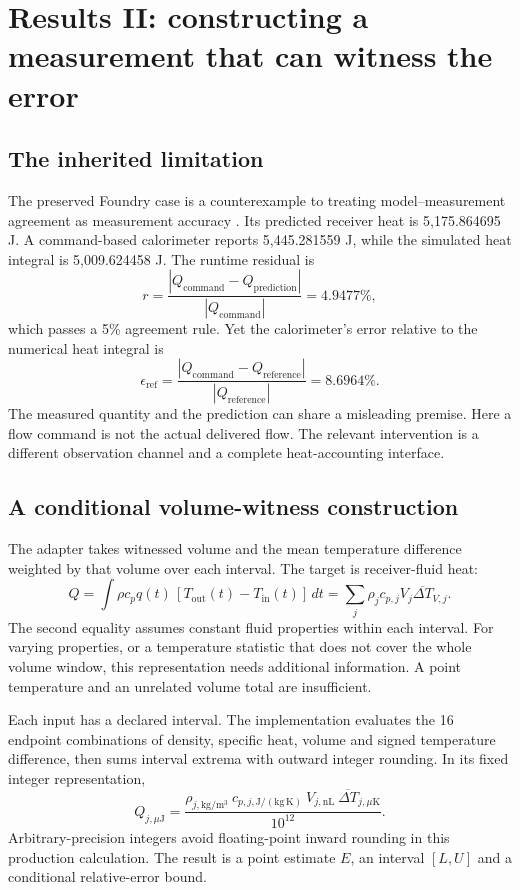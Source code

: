 \documentclass[11pt,a4paper]{article}
\begin{document}
\section{Results II: constructing a measurement that can witness the error}\label{sec:thermal}
\subsection{The inherited limitation}
The preserved Foundry case is a counterexample to treating model--measurement agreement as measurement accuracy \cite{boucher2026foundry}. Its predicted receiver heat is 5,175.864695 J. A command-based calorimeter reports 5,445.281559 J, while the simulated heat integral is 5,009.624458 J. The runtime residual is
\begin{equation}
r=\frac{|Q_{\mathrm{command}}-Q_{\mathrm{prediction}}|}
{|Q_{\mathrm{command}}|}=4.9477\%,
\end{equation}
which passes a 5\% agreement rule. Yet the calorimeter's error relative to the numerical heat integral is
\begin{equation}
\epsilon_{\mathrm{ref}}=
\frac{|Q_{\mathrm{command}}-Q_{\mathrm{reference}}|}
{|Q_{\mathrm{reference}}|}=8.6964\%.
\end{equation}
The measured quantity and the prediction can share a misleading premise. Here a flow command is not the actual delivered flow. The relevant intervention is a different observation channel and a complete heat-accounting interface.

\subsection{A conditional volume-witness construction}
The adapter takes witnessed volume and the mean temperature difference weighted by that volume over each interval. The target is receiver-fluid heat:
\begin{equation}
Q=\int \rho c_p q(t)\,[T_{\mathrm{out}}(t)-T_{\mathrm{in}}(t)]\,dt
 =\sum_j \rho_j c_{p,j} V_j\overline{\Delta T}_{V,j}.
\label{eq:heat}
\end{equation}
The second equality assumes constant fluid properties within each interval. For varying properties, or a temperature statistic that does not cover the whole volume window, this representation needs additional information. A point temperature and an unrelated volume total are insufficient.

Each input has a declared interval. The implementation evaluates the 16 endpoint combinations of density, specific heat, volume and signed temperature difference, then sums interval extrema with outward integer rounding. In its fixed integer representation,
\begin{equation}
Q_{j,\mu\mathrm{J}}=
\frac{\rho_{j,\mathrm{kg/m^3}}\ c_{p,j,\mathrm{J/(kg\,K)}}\
 V_{j,\mathrm{nL}}\ \overline{\Delta T}_{j,\mu\mathrm{K}}}{10^{12}}.
\label{eq:microheat}
\end{equation}
Arbitrary-precision integers avoid floating-point inward rounding in this production calculation. The result is a point estimate \(E\), an interval \([L,U]\) and a conditional relative-error bound.
\end{document}
